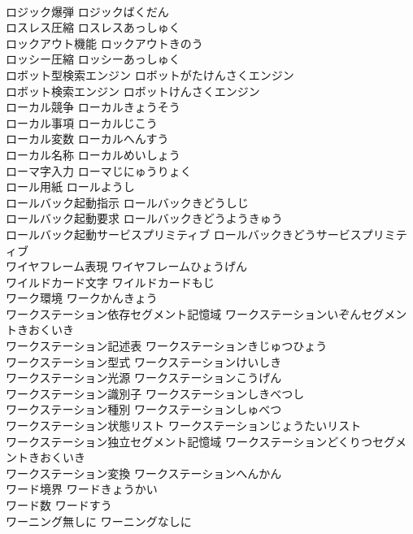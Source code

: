 \documentclass[8pt]{extreport}
\begin{document}
\begin{CJK}{UTF8}{min}
\\	ロジック爆弾	ロジックばくだん	
\\	ロスレス圧縮	ロスレスあっしゅく	
\\	ロックアウト機能	ロックアウトきのう	
\\	ロッシー圧縮	ロッシーあっしゅく	
\\	ロボット型検索エンジン	ロボットがたけんさくエンジン	
\\	ロボット検索エンジン	ロボットけんさくエンジン	
\\	ローカル競争	ローカルきょうそう	
\\	ローカル事項	ローカルじこう	
\\	ローカル変数	ローカルへんすう	
\\	ローカル名称	ローカルめいしょう	
\\	ローマ字入力	ローマじにゅうりょく	
\\	ロール用紙	ロールようし	
\\	ロールバック起動指示	ロールバックきどうしじ	
\\	ロールバック起動要求	ロールバックきどうようきゅう	
\\	ロールバック起動サービスプリミティブ	ロールバックきどうサービスプリミティブ	
\\	ワイヤフレーム表現	ワイヤフレームひょうげん	
\\	ワイルドカード文字	ワイルドカードもじ	
\\	ワーク環境	ワークかんきょう	
\\	ワークステーション依存セグメント記憶域	ワークステーションいぞんセグメントきおくいき	
\\	ワークステーション記述表	ワークステーションきじゅつひょう	
\\	ワークステーション型式	ワークステーションけいしき	
\\	ワークステーション光源	ワークステーションこうげん	
\\	ワークステーション識別子	ワークステーションしきべつし	
\\	ワークステーション種別	ワークステーションしゅべつ	
\\	ワークステーション状態リスト	ワークステーションじょうたいリスト	
\\	ワークステーション独立セグメント記憶域	ワークステーションどくりつセグメントきおくいき	
\\	ワークステーション変換	ワークステーションへんかん	
\\	ワード境界	ワードきょうかい	
\\	ワード数	ワードすう	
\\	ワーニング無しに	ワーニングなしに	

\end{CJK}
\end{document}
